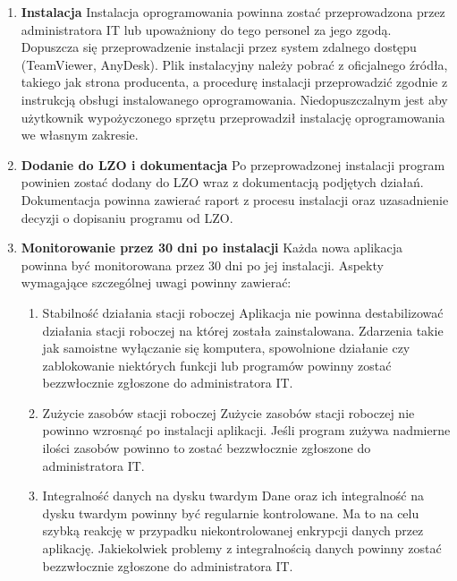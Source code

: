 \documentclass[12pt,a4paper]{article}
\begin{document}
\begin{enumerate}
\item
  \textbf{Instalacja} 
  \newline
  Instalacja oprogramowania powinna zostać przeprowadzona przez administratora IT lub upoważniony do tego personel za jego zgodą. Dopuszcza się przeprowadzenie instalacji przez system zdalnego dostępu (TeamViewer, AnyDesk). Plik instalacyjny należy pobrać z oficjalnego źródła, takiego jak strona producenta, a procedurę instalacji przeprowadzić zgodnie z instrukcją obsługi instalowanego oprogramowania. Niedopuszczalnym jest aby użytkownik wypożyczonego sprzętu przeprowadził instalację oprogramowania we własnym zakresie.
\item
  \textbf{Dodanie do LZO i dokumentacja}
  \newline
  Po przeprowadzonej instalacji program powinien zostać dodany do LZO wraz z dokumentacją podjętych działań. Dokumentacja powinna zawierać raport z procesu instalacji oraz uzasadnienie decyzji o dopisaniu programu od LZO.
\item
  \textbf{Monitorowanie przez 30 dni po instalacji}
  \newline
  Każda nowa aplikacja powinna być monitorowana przez 30 dni po jej instalacji. Aspekty wymagające szczególnej uwagi powinny zawierać:
  \begin{enumerate}
      \item Stabilność działania stacji roboczej Aplikacja nie powinna destabilizować działania stacji roboczej na której została zainstalowana. Zdarzenia takie jak samoistne wyłączanie się komputera, spowolnione działanie czy zablokowanie niektórych funkcji lub programów powinny zostać bezzwłocznie zgłoszone do administratora IT.
      \item Zużycie zasobów stacji roboczej Zużycie zasobów stacji roboczej nie powinno wzrosnąć po instalacji aplikacji. Jeśli program zużywa nadmierne ilości zasobów powinno to zostać bezzwłocznie zgłoszone do administratora IT.
      \item Integralność danych na dysku twardym Dane oraz ich integralność na dysku twardym powinny być regularnie kontrolowane. Ma to na celu szybką reakcję w przypadku niekontrolowanej enkrypcji danych przez aplikację. Jakiekolwiek problemy z integralnością danych powinny zostać bezzwłocznie zgłoszone do administratora IT.
  \end{enumerate}
\end{enumerate}
\end{document}
